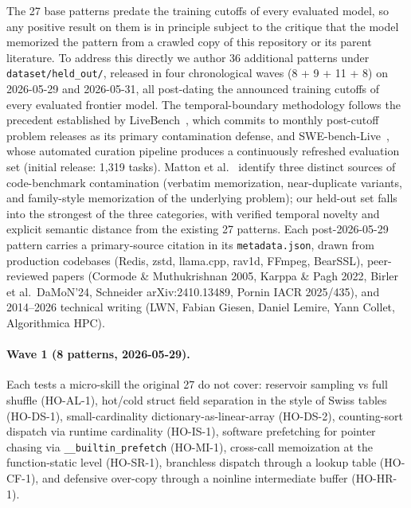 The 27 base patterns predate the training cutoffs of every evaluated model, so any positive result on them is in principle subject to the critique that the model memorized the pattern from a crawled copy of this repository or its parent literature. To address this directly we author 36 additional patterns under \texttt{dataset/held\_out/}, released in four chronological waves (8 + 9 + 11 + 8) on 2026-05-29 and 2026-05-31, all post-dating the announced training cutoffs of every evaluated frontier model. The temporal-boundary methodology follows the precedent established by LiveBench~\cite{livebench2024}, which commits to monthly post-cutoff problem releases as its primary contamination defense, and SWE-bench-Live~\cite{swebenchlive2025}, whose automated curation pipeline produces a continuously refreshed evaluation set (initial release: 1,319 tasks). Matton et al.~\cite{lbpp2024} identify three distinct sources of code-benchmark contamination (verbatim memorization, near-duplicate variants, and family-style memorization of the underlying problem); our held-out set falls into the strongest of the three categories, with verified temporal novelty and explicit semantic distance from the existing 27 patterns. Each post-2026-05-29 pattern carries a primary-source citation in its \texttt{metadata.json}, drawn from production codebases (Redis, zstd, llama.cpp, rav1d, FFmpeg, BearSSL), peer-reviewed papers (Cormode \& Muthukrishnan 2005, Karppa \& Pagh 2022, Birler et al.\ DaMoN'24, Schneider arXiv:2410.13489, Pornin IACR 2025/435), and 2014--2026 technical writing (LWN, Fabian Giesen, Daniel Lemire, Yann Collet, Algorithmica HPC).

\paragraph{Wave 1 (8 patterns, 2026-05-29).} Each tests a micro-skill the original 27 do not cover: reservoir sampling vs full shuffle (HO-AL-1), hot/cold struct field separation in the style of Swiss tables~\cite{swisstables} (HO-DS-1), small-cardinality dictionary-as-linear-array (HO-DS-2), counting-sort dispatch via runtime cardinality (HO-IS-1), software prefetching for pointer chasing via \texttt{\_\_builtin\_prefetch} (HO-MI-1), cross-call memoization at the function-static level (HO-SR-1), branchless dispatch through a lookup table (HO-CF-1), and defensive over-copy through a noinline intermediate buffer (HO-HR-1).

